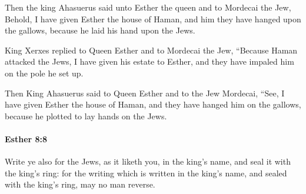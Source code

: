 			\begin{versebox}
					\item[BHS] 
					\item[LXX] 
					\item[ASV] Then the king Ahasuerus said unto Esther the queen and to Mordecai the Jew, Behold, I have given Esther the house of Haman, and him they have hanged upon the gallows, because he laid his hand upon the Jews.
					\item[NIV] King Xerxes replied to Queen Esther and to Mordecai the Jew, “Because Haman attacked the Jews, I have given his estate to Esther, and they have impaled him on the pole he set up.
					\item[NRSV] Then King Ahasuerus said to Queen Esther and to the Jew Mordecai, “See, I have given Esther the house of Haman, and they have hanged him on the gallows, because he plotted to lay hands on the Jews.
			\end{versebox}

		\paragraph{Esther 8:8} %
			\label{ESTHER-8-8}

			Write ye also for the Jews, as it liketh you, in the king’s name, and seal it with the king’s ring: for the writing which is written in the king’s name, and sealed with the king’s ring, may no man reverse.

